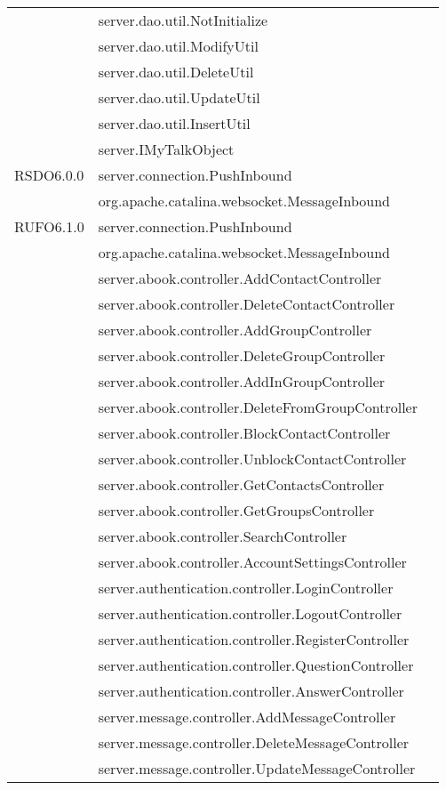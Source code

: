\begin{center}
\begin{longtable}{lp{}l}
& server.dao.util.NotInitialize\\
& server.dao.util.ModifyUtil\\
& server.dao.util.DeleteUtil\\
& server.dao.util.UpdateUtil\\
& server.dao.util.InsertUtil\\
& server.IMyTalkObject\\
RSDO6.0.0 & server.connection.PushInbound\\
& org.apache.catalina.websocket.MessageInbound\\
RUFO6.1.0 & server.connection.PushInbound\\
& org.apache.catalina.websocket.MessageInbound\\
& server.abook.controller.AddContactController\\
& server.abook.controller.DeleteContactController\\
& server.abook.controller.AddGroupController\\
& server.abook.controller.DeleteGroupController\\
& server.abook.controller.AddInGroupController\\
& server.abook.controller.DeleteFromGroupController\\
& server.abook.controller.BlockContactController\\
& server.abook.controller.UnblockContactController\\
& server.abook.controller.GetContactsController\\
& server.abook.controller.GetGroupsController\\
& server.abook.controller.SearchController\\
& server.abook.controller.AccountSettingsController\\
& server.authentication.controller.LoginController\\
& server.authentication.controller.LogoutController\\
& server.authentication.controller.RegisterController\\
& server.authentication.controller.QuestionController\\
& server.authentication.controller.AnswerController\\
& server.message.controller.AddMessageController\\
& server.message.controller.DeleteMessageController\\
& server.message.controller.UpdateMessageController\\

\end{longtable}
\end{center}
